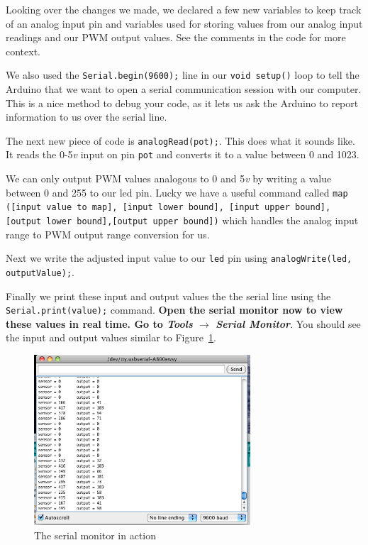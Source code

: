 \documentclass[11pt,a4paper]{article}
\begin{document}
Looking over the changes we made, we declared a few new variables to keep track of an analog input pin and variables used for storing values from our analog input readings and our PWM output values.  See the comments in the code for more context.  

We also used the 
\texttt{Serial.begin(9600);} line in our \texttt{void setup()} loop to tell the Arduino that we want to open a serial communication session with our computer.  This is a nice method to debug your code, as it lets us ask the Arduino to report information to us over the serial line. 

The next new piece of code is \texttt{analogRead(pot);}.  This does what it sounds like.  It reads the 0-5\emph{v} input on pin \texttt{pot} and converts it to a value between 0 and 1023.

We can only output PWM values analogous to 0 and 5\emph{v} by writing a value between 0 and 255 to our led pin.  Lucky we have a useful command called \texttt{map ([input value to map], [input lower bound], [input upper bound], [output lower bound],[output upper bound])} which handles the analog input range to PWM output range conversion for us.

Next we write the adjusted input value to our \texttt{led} pin using \texttt{analogWrite(led, outputValue);}. 

Finally we print these input and output values the the serial line using the \texttt{Serial.print(value);} command.  \textbf{Open the serial monitor now to view these values in real time.  Go to \emph{Tools} $\rightarrow$  \emph{Serial Monitor}}.  You should see the input and output values similar to Figure~\ref{fig:figures_serial-mon}.

\begin{figure}[htbp]
    \centering
        \includegraphics[height=2.5in]{figures/serial-mon.png}
    \caption{The serial monitor in action}
    \label{fig:figures_serial-mon}
\end{figure}
\end{document}
